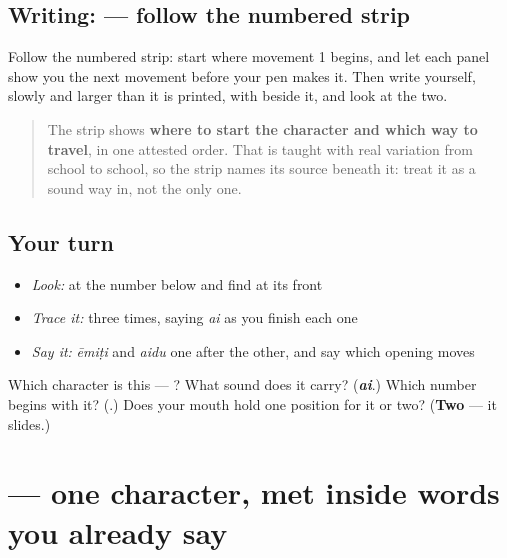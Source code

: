 \subsection*{Writing:  — follow the numbered strip}

Follow the numbered strip: start where movement 1 begins, and let each panel show you the next movement before your pen makes it. Then write  yourself, slowly and larger than it is printed, with  beside it, and look at the two.

\begin{quote}
The strip shows \textbf{where to start the character and which way to travel}, in one attested order. That is taught with real variation from school to school, so the strip names its source beneath it: treat it as a sound way in, not the only one.
\end{quote}

\subsection*{Your turn}
\begin{itemize}
\raggedright
  \item \emph{Look:} at the number below and find  at its front
\end{itemize}

\begin{quote}
\end{quote}

\begin{itemize}
\raggedright
  \item \emph{Trace it:}  three times, saying \emph{ai} as you finish each one
  \item \emph{Say it:} \emph{ēmiṭi} and \emph{aidu} one after the other, and say which opening moves
\end{itemize}

\begin{tcolorbox}[breakable,colback=teal!4,colframe=teal!35!black,title={Before you move on}]
Which character is this — ? What sound does it carry? (\emph{\textbf{ai}}.) Which number begins with it? (\textbf{}.) Does your mouth hold one position for it or two? (\textbf{Two} — it slides.)
\end{tcolorbox}
\section[\texorpdfstring{\te{ూ} (ū)}{ూ (ū)}]{ — one character, met inside words you already say}

